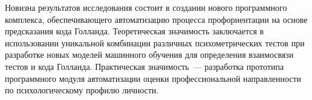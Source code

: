Новизна результатов исследования состоит в создании нового программного комплекса, обеспечивающего автоматизацию процесса профориентации на основе предсказания кода Голланда. Теоретическая значимость заключается в использовании уникальной комбинации различных психометрических тестов при разработке новых моделей машинного обучения для определения взаимосвязи тестов и кода Голланда. Практическая значимость~--- разработка прототипа программного модуля автоматизации оценки профессиональной направленности по психологическому профилю личности.
